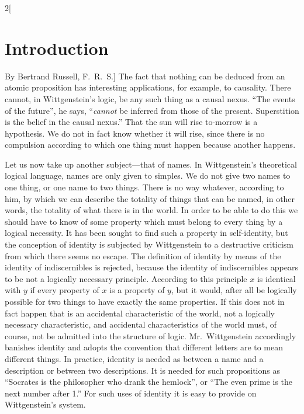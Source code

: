 \documentclass[oneside,openany,12pt]{book}
\begin{document}
\begin{multicols}{2}[\section*{Introduction}By Bertrand Russell, F.\ R.\ S.]
The fact that nothing can be deduced from an atomic proposition has interesting applications, for example, to causality. There cannot, in Wittgenstein's logic, be any such thing as a causal nexus. ``The events of the future'', he says, ``\emph{cannot} be inferred from those of the present. Superstition is the belief in the causal nexus.'' That the sun will rise to-morrow is a hypothesis. We do not in fact know whether it will rise, since there is no compulsion according to which one thing must happen because another happens.

Let us now take up another subject---that of names. In Wittgenstein's theoretical logical language, names are only given to simples. We do not give two names to one thing, or one name to two things. There is no way whatever, according to him, by which we can describe the totality of things that can be named, in other words, the totality of what there is in the world. In order to be able to do this we should have to know of some property which must belong to every thing by a logical necessity. It has been sought to find such a property in self-identity, but the conception of identity is subjected by Wittgenstein to a destructive criticism from which there seems no escape. The definition of identity by means of the identity of indiscernibles is rejected, because the identity of indiscernibles appears to be not a logically necessary principle. According to this principle $x$ is identical with $y$ if every property of $x$ is a property of $y$, but it would, after all be logically possible for two things to have exactly the same properties. If this does not in fact happen that is an accidental characteristic of the world, not a logically necessary characteristic, and accidental characteristics of the world must, of course, not be admitted into the structure of logic. Mr.\ Wittgenstein accordingly banishes identity and adopts the convention that different letters are to mean different things. In practice, identity is needed as between a name and a description or between two descriptions. It is needed for such propositions as ``Socrates is the philosopher who drank the hemlock'', or ``The even prime is the next number after 1.'' For such uses of identity it is easy to provide on Wittgenstein's system.


\end{multicols}
\end{document}
